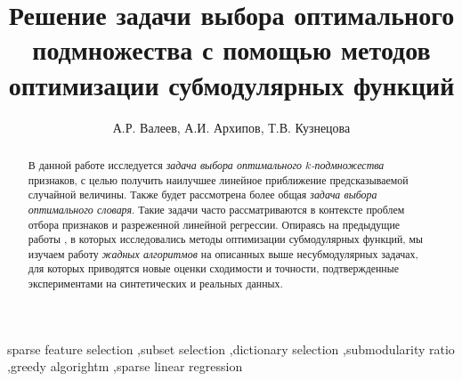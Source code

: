 \documentclass[preprint,12pt]{elsarticle}
\begin{document}
\begin{frontmatter}


\title{Решение задачи выбора оптимального подмножества с помощью методов оптимизации субмодулярных функций}




\author{А.Р. Валеев, А.И. Архипов, Т.В. Кузнецова}

\address{Московский физико-технический институт, Долгопрудный}
\begin{abstract}
В данной работе исследуется \textit{задача выбора оптимального} \textit{$k$-подмножества} признаков, с целью получить наилучшее линейное приближение предсказываемой случайной величины. Также будет рассмотрена более общая \textit{задача выбора оптимального словаря}.
Такие задачи часто рассматриваются в контексте проблем отбора признаков и разреженной линейной регрессии. Опираясь на предыдущие работы \cite{nemhauser1978analysis, lovasz1983submodular}, в которых исследовались методы оптимизации субмодулярных функций, мы изучаем работу \textit{жадных алгоритмов} на описанных выше несубмодулярных задачах, для которых приводятся новые оценки сходимости и точности, подтвержденные экспериментами на синтетических и реальных данных. 

\end{abstract}

\begin{keyword}
sparse feature selection \sep subset selection \sep dictionary selection \sep submodularity ratio \sep greedy algorightm \sep sparse linear regression
\end{keyword}

\end{frontmatter}
\end{document}
